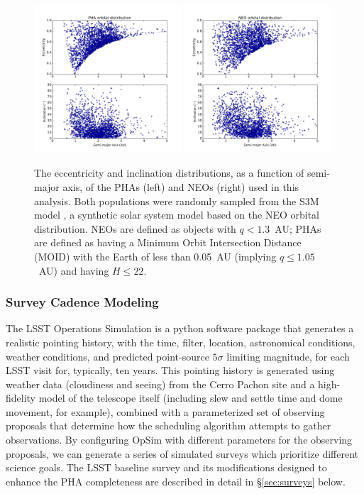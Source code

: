 \begin{figure}[t!]
\centering
\includegraphics[width=0.49\textwidth]{figures/phas_2k_orbits}
\includegraphics[width=0.49\textwidth]{figures/neos_2k_orbits}
\vskip -0.2in
\caption{The eccentricity and inclination distributions, as a function of semi-major axis, of the PHAs (left) and NEOs (right) used in this analysis. Both populations were randomly sampled from the S3M model \citep{Grav2011}, a synthetic solar system model based on the \cite{Bottke2002} NEO orbital distribution. NEOs are defined as objects with $q<1.3$~AU; PHAs are defined as having a Minimum Orbit Intersection Distance (MOID) with the Earth of less than 0.05~AU (implying $q\le1.05$~AU) and having $H\le22$.  \label{fig:PHA_orbits}}
\end{figure}

\subsubsection{Survey Cadence Modeling}

The LSST Operations Simulation \citep[OpSim,][]{delgado14} is a python software package that generates a realistic pointing history, with the time, filter, location, astronomical conditions, weather conditions, and predicted point-source $5\sigma$ limiting magnitude, for each LSST visit
for, typically, ten years. This pointing history is generated using weather data (cloudiness and seeing) from the Cerro Pachon site and a high-fidelity model of the telescope itself (including slew and settle time and dome movement, for example), combined with a parameterized set of observing proposals that determine how the scheduling algorithm attempts to gather observations. By configuring OpSim with different parameters for the observing proposals, we can generate a series of simulated surveys which prioritize different science goals. The LSST baseline survey and its modifications designed to enhance the PHA completeness are described in detail
in \S\ref{sec:surveys} below.


